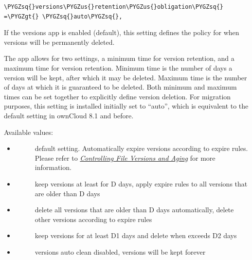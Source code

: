 \documentclass[letterpaper,10pt,english]{sphinxmanual}
\def\PYGZus{\char`\_}
\def\PYGZgt{\char`\>}
\def\PYGZsq{\char`\'}
\begin{document}
\begin{Verbatim}[commandchars=\\\{\}]
\PYGZsq{}versions\PYGZus{}retention\PYGZus{}obligation\PYGZsq{} =\PYGZgt{} \PYGZsq{}auto\PYGZsq{},
\end{Verbatim}

If the versions app is enabled (default), this setting defines the policy
for when versions will be permanently deleted.

The app allows for two settings, a minimum time for version retention,
and a maximum time for version retention.
Minimum time is the number of days a version will be kept, after which it
may be deleted. Maximum time is the number of days at which it is guaranteed
to be deleted.
Both minimum and maximum times can be set together to explicitly define
version deletion. For migration purposes, this setting is installed
initially set to ``auto'', which is equivalent to the default setting in
ownCloud 8.1 and before.

Available values:
\begin{itemize}
\item {} \begin{description}
\item[{}] \leavevmode
default setting. Automatically expire versions according to expire
rules. Please refer to {\hyperref[configuration_files/file_versioning::doc]{\emph{Controlling File Versions and Aging}}} for
more information.

\end{description}

\item {} \begin{description}
\item[{}] \leavevmode
keep versions at least for D days, apply expire rules to all versions
that are older than D days

\end{description}

\item {} \begin{description}
\item[{}] \leavevmode
delete all versions that are older than D days automatically, delete
other versions according to expire rules

\end{description}

\item {} \begin{description}
\item[{}] \leavevmode
keep versions for at least D1 days and delete when exceeds D2 days

\end{description}

\item {} \begin{description}
\item[{}] \leavevmode
versions auto clean disabled, versions will be kept forever

\end{description}

\end{itemize}
\end{document}
